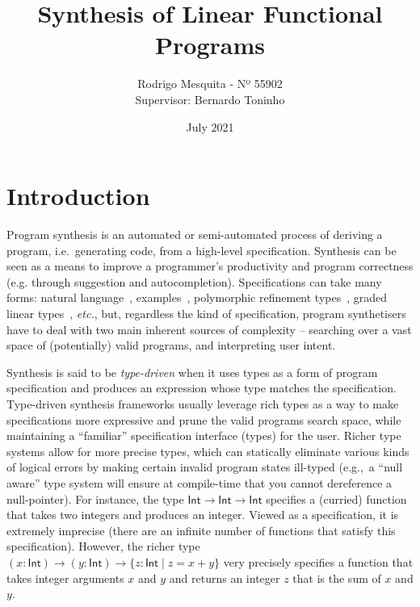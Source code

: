 \documentclass{llncs}
\title{Synthesis of Linear Functional Programs}
\author{Rodrigo Mesquita - Nº 55902 \\
    Supervisor: Bernardo Toninho}
\date{July 2021}
\institute{NOVA School of Science and Technology}
\begin{document}
\maketitle

\section{Introduction}

Program synthesis is an automated or semi-automated process of deriving a
program, i.e.~generating code, from a high-level specification. Synthesis can be
seen as a means to improve a programmer's productivity and program correctness
(e.g. through suggestion and autocompletion).
%
Specifications can take many forms: natural language~\cite{chen2021evaluating},
examples~\cite{DBLP:conf/popl/FrankleOWZ16}, polymorphic refinement
types~\cite{DBLP:conf/pldi/PolikarpovaKS16}, graded linear
types~\cite{DBLP:conf/lopstr/HughesO20}, \emph{etc.}, but, regardless the kind of
specification, program synthetisers have to deal with two main inherent sources
of complexity -- searching over a vast space of (potentially) valid programs,
and interpreting user intent.

Synthesis is said to be \emph{type-driven} when it uses types as a form of program
specification and produces an expression whose type matches the specification.
Type-driven synthesis frameworks usually leverage rich types as a way to make
specifications more expressive and prune the valid programs search space, while
maintaining a ``familiar'' specification interface (types) for the user.
%
Richer type systems allow for more precise types, which can statically eliminate
various kinds of logical errors by making certain invalid program states
ill-typed (e.g.,~a ``null aware'' type system will ensure at compile-time that
you cannot dereference a null-pointer).
%
%
For instance, the type $\mathsf{Int} \rightarrow \mathsf{Int} \rightarrow
\mathsf{Int}$ specifies a (curried) function that takes two integers and
produces an integer. Viewed as a specification, it is extremely imprecise (there
are an infinite number of functions that satisfy this specification).  However,
the richer type $(x{:}\mathsf{Int}) \rightarrow (y{:}\mathsf{Int}) \rightarrow
\{z{:}\mathsf{Int} \mid z = x+y\}$ very precisely specifies a function that
takes integer arguments $x$ and $y$ and returns an integer $z$ that is the sum
of $x$ and $y$. 
\end{document}
